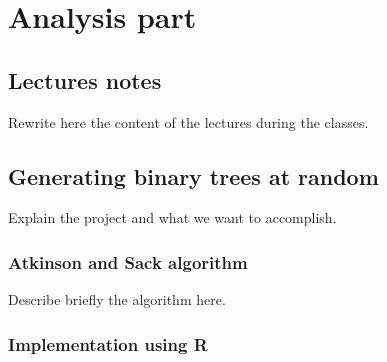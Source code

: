 \documentclass[twoside,openright,titlepage,fleqn,
	headinclude,11pt,a4paper,BCOR5mm,footinclude
	]{scrbook}
\begin{document}
\frenchspacing
\raggedbottom
{}
\pagestyle{plain}

\pagestyle{scrheadings}

\lstset{
	language = R
	, numbers = left 
	, basicstyle=\sffamily%
	, tabsize=2
	, captionpos=b
	, breaklines=true
	, showspaces=false
	, showstringspaces=false
}

\tableofcontents

\newpage



\part{Analysis part}

\chapter{Lectures notes}
Rewrite here the content of the lectures during the classes.

\chapter{Generating binary trees at random}
Explain the project and what we want to accomplish.

\section{Atkinson and Sack algorithm}
Describe briefly the algorithm here.

\section{Implementation using R}
\end{document}
